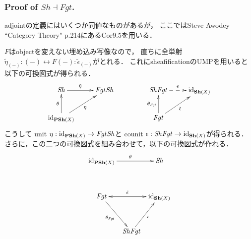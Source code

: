 \documentclass[a4paper]{jsarticle}
\newcommand{\Sh}{\mathbf{Sh}}
\newcommand{\PSh}{\mathbf{PSh}}
\newcommand{\ftorSh}{\mathit{Sh}}
\newcommand{\ftorFgt}{\mathit{Fgt}}
\begin{document}
    \subsubsection{Proof of $\ftorSh \dashv \ftorFgt$.}
    adjointの定義にはいくつか同値なものがあるが，
    ここではSteve Awodey ``Category Theory" p.214にあるCor9.5を用いる．

    $F$はobjectを変えない埋め込み写像なので，
    直ちに全単射$\tilde{\eta}_{(-)}: (-) \leftrightarrow F(-):\tilde{\epsilon}_{(-)}$がとれる．
    これにsheafificationのUMPを用いると以下の可換図式が得られる．
    \[
    \xymatrix
    {
    \ftorSh \ar@{->}[r]^-{\tilde{\eta}_{}}& \ftorFgt \ftorSh\\
    \id{\PSh(X)} \ar[ru]_-{\eta} \ar[u]^-{\theta}& {}
    }
    \hspace{15mm}
    \xymatrix
    {
    \ftorSh \ftorFgt \ar@{-->}[r]^-{\epsilon_{}}& \id{\Sh(X)}\\
    \ftorFgt \ar[ru]_-{\tilde{\epsilon}_{}} \ar[u]^-{\theta_{\ftorFgt}}& {}
    }
    \]
    こうして
    unit $\eta: \id{\PSh(X)} \to \ftorFgt \ftorSh$と
    counit $\epsilon: \ftorSh \ftorFgt \to \id{\Sh(X)}$が得られる．
    さらに，この二つの可換図式を組み合わせて，以下の可換図式が作れる．
    \[
    \xymatrix@C=5pt@R=35pt
    {
    \id{\PSh(X)} \ar[rr]^{\theta_{}} & {} & \ftorSh  \\
    \ftorFgt \ar@{<->}[rr]^-{\tilde{\epsilon}_{}} \ar[rd]_-{\theta_{\ftorFgt}} & {} & \id{\Sh(X)} \\
    {} & \ftorSh \ftorFgt \ar[ru]_-{\epsilon_{}} & {}
    }
    \]
\end{document}
